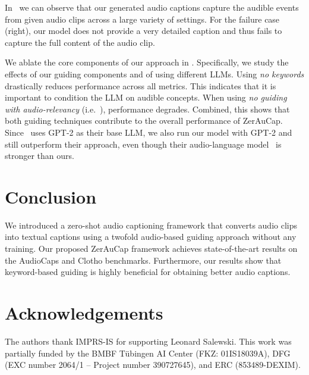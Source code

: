 \documentclass{article}
\newcommand{\modelName}{ZerAuCap\xspace}
\newcommand{\mypara}[1]{\vspace{2pt}\noindent{\bf{#1}}}
\begin{document}
\mypara{Qualitative results.}
In~ we can observe that our generated audio captions capture the audible events from given audio clips across a large variety of settings.
For the failure case (right), our model does not provide a very detailed caption and thus fails to capture the full content of the audio clip.

\mypara{Ablations.} We ablate the core components of our approach in . Specifically, we study the effects of our guiding components and of using different LLMs\@. Using \emph{no keywords} drastically reduces performance across all metrics. This indicates that it is important to condition the LLM on audible concepts.
When using \emph{no guiding with audio-relevancy} (i.e.\ ), performance degrades. Combined, this shows that both guiding techniques contribute to the overall performance of \modelName.
Since~\cite{shaharabany2023zero} uses GPT-2 as their base LLM, we also run our model with GPT-2 and still outperform their approach, even though their audio-language model~\cite{Girdhar2023ImageBindOE} is stronger than ours.




\section{Conclusion}
We introduced a zero-shot audio captioning framework that converts audio clips into textual captions using a twofold audio-based guiding approach without any training. Our proposed \modelName framework achieves state-of-the-art results on the AudioCaps and Clotho benchmarks. Furthermore, our results show that keyword-based guiding is highly beneficial for obtaining better audio captions.


\section{Acknowledgements}
The authors thank IMPRS-IS for supporting Leonard Salewski. This work was partially funded by the BMBF Tübingen AI Center (FKZ: 01IS18039A), DFG (EXC number 2064/1 – Project number 390727645), and ERC (853489-DEXIM).




\end{document}
